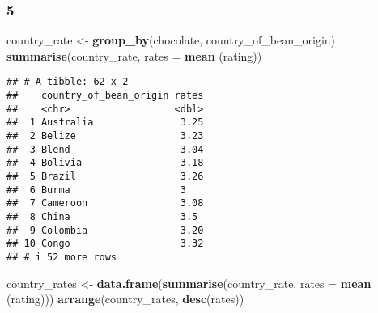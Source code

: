 \documentclass[
]{article}
\newenvironment{Shaded}{\begin{snugshade}}{\end{snugshade}}
\newcommand{\AttributeTok}[1]{\textcolor[rgb]{0.13,0.29,0.53}{#1}}
\newcommand{\FunctionTok}[1]{\textcolor[rgb]{0.13,0.29,0.53}{\textbf{#1}}}
\newcommand{\NormalTok}[1]{#1}
\newcommand{\OtherTok}[1]{\textcolor[rgb]{0.56,0.35,0.01}{#1}}
\begin{document}
\hypertarget{section-3}{%
\subsubsection{5}\label{section-3}}

\begin{Shaded}
\begin{Highlighting}[]
\NormalTok{country\_rate }\OtherTok{\textless{}{-}} \FunctionTok{group\_by}\NormalTok{(chocolate, country\_of\_bean\_origin)}
\FunctionTok{summarise}\NormalTok{(country\_rate, }\AttributeTok{rates =} \FunctionTok{mean}\NormalTok{ (rating))}
\end{Highlighting}
\end{Shaded}

\begin{verbatim}
## # A tibble: 62 x 2
##    country_of_bean_origin rates
##    <chr>                  <dbl>
##  1 Australia               3.25
##  2 Belize                  3.23
##  3 Blend                   3.04
##  4 Bolivia                 3.18
##  5 Brazil                  3.26
##  6 Burma                   3   
##  7 Cameroon                3.08
##  8 China                   3.5 
##  9 Colombia                3.20
## 10 Congo                   3.32
## # i 52 more rows
\end{verbatim}

\begin{Shaded}
\begin{Highlighting}[]
\NormalTok{country\_rates }\OtherTok{\textless{}{-}} \FunctionTok{data.frame}\NormalTok{(}\FunctionTok{summarise}\NormalTok{(country\_rate, }\AttributeTok{rates =} \FunctionTok{mean}\NormalTok{ (rating)))}
\FunctionTok{arrange}\NormalTok{(country\_rates, }\FunctionTok{desc}\NormalTok{(rates))}
\end{Highlighting}
\end{Shaded}
\end{document}
